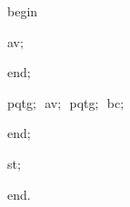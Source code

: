 {\vspace{\neglskip}\mbox{\blc  \blk\blk\blk\blk\idt  \mcl begin\idt }\par 
\vspace{\neglskip}\mbox{\blc  \blk\blk\blk\blk\blk\idt  av$;$}\par 
\vspace{\neglskip}\mbox{\blc  \blk\blk\blk\blk\idt  \mcl end\idt $;$}\par 
\vspace{\neglskip}\mbox{\blc  \blk\blk\blk\idt  pqtg$;$\ av$;$\ pqtg$;$\ bc$;$\ }\par 
\vspace{\neglskip}\mbox{\blc  \blk\blk\idt  \mcl end\idt $;$}\par 
\vspace{\neglskip}\mbox{\blc  \blk\idt  st$;$}\par 
\vspace{\neglskip}\mbox{\blc  \idt  \mcl end\idt $.$}\par 

\medskip }

